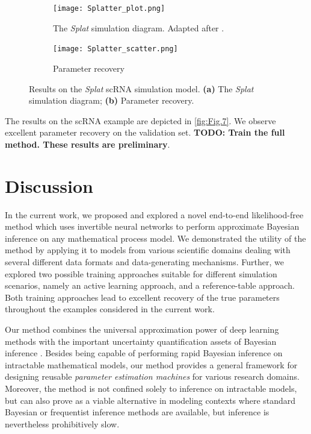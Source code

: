 \documentclass[9pt,twoside,lineno]{pnas-new}
\begin{document}
\begin{figure}[H]
\centering
\begin{subfigure}{.49\textwidth}
    \centering
    \texttt{[image: Splatter\_plot.png]}
    \caption{The \textit{Splat} simulation diagram. Adapted after \cite{zappia2017splatter}.}
    \label{fig:Fig.7a}
\end{subfigure}
\begin{subfigure}{.49\textwidth}
    \centering
    \texttt{[image: Splatter\_scatter.png]}
    \caption{Parameter recovery }
    \label{fig:Fig.7b}
\end{subfigure}
\caption[short]{Results on the \textit{Splat} scRNA simulation model. \textbf{(a)} The \textit{Splat} simulation diagram; \textbf{(b)} Parameter recovery.} \label{fig:Fig.7}
\end{figure}
The results on the scRNA example are depicted in \autoref{fig:Fig.7}. We observe excellent parameter recovery on the validation set. \textbf{TODO: Train the full method. These results are preliminary}.

\section*{Discussion}

In the current work, we proposed and explored a novel end-to-end likelihood-free method which uses invertible neural networks to perform approximate Bayesian inference on any mathematical process model. We demonstrated the utility of the method by applying it to models from various scientific domains dealing with several different data formats and data-generating mechanisms. Further, we explored two possible training approaches suitable for different simulation scenarios, namely an active learning approach, and a reference-table approach. Both training approaches lead to excellent recovery of the true parameters throughout the examples considered in the current work.

Our method combines the universal approximation power of deep learning methods with the important uncertainty quantification assets of Bayesian inference \cite{kendall2017uncertainties, gelman2013bayesian}. Besides being capable of performing rapid Bayesian inference on intractable mathematical models, our method provides a general framework for designing reusable \textit{parameter estimation machines} for various research domains. Moreover, the method is not confined solely to inference on intractable models, but can also prove as a viable alternative in modeling contexts where standard Bayesian or frequentist inference methods are available, but inference is nevertheless prohibitively slow. 
\end{document}
